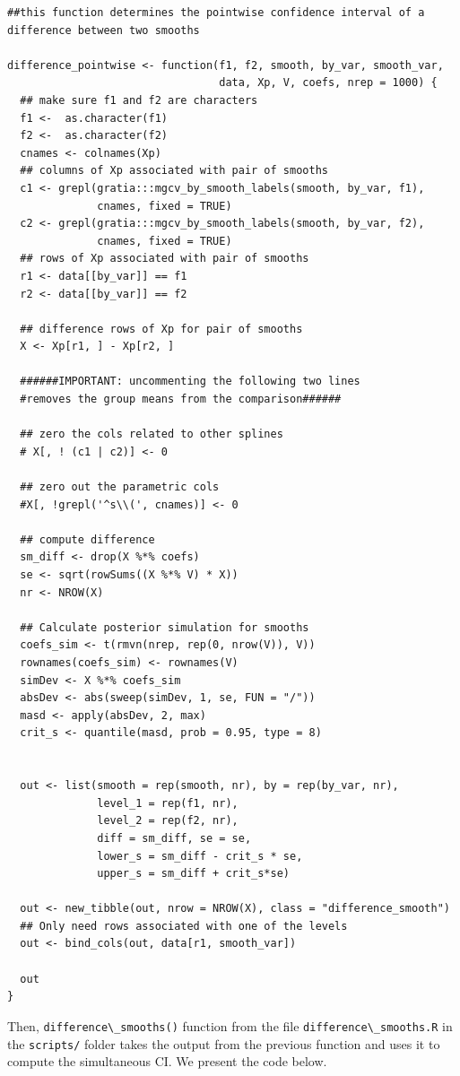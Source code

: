 \documentclass[
]{article}
\newcommand{\passthrough}[1]{#1}
\begin{document}
\begin{lstlisting}
##this function determines the pointwise confidence interval of a difference between two smooths

difference_pointwise <- function(f1, f2, smooth, by_var, smooth_var, 
                                 data, Xp, V, coefs, nrep = 1000) {
  ## make sure f1 and f2 are characters
  f1 <-  as.character(f1)
  f2 <-  as.character(f2)
  cnames <- colnames(Xp)
  ## columns of Xp associated with pair of smooths
  c1 <- grepl(gratia:::mgcv_by_smooth_labels(smooth, by_var, f1),
              cnames, fixed = TRUE)
  c2 <- grepl(gratia:::mgcv_by_smooth_labels(smooth, by_var, f2), 
              cnames, fixed = TRUE)
  ## rows of Xp associated with pair of smooths
  r1 <- data[[by_var]] == f1
  r2 <- data[[by_var]] == f2
  
  ## difference rows of Xp for pair of smooths
  X <- Xp[r1, ] - Xp[r2, ]
  
  ######IMPORTANT: uncommenting the following two lines
  #removes the group means from the comparison######
  
  ## zero the cols related to other splines
  # X[, ! (c1 | c2)] <- 0
  
  ## zero out the parametric cols
  #X[, !grepl('^s\\(', cnames)] <- 0
  
  ## compute difference
  sm_diff <- drop(X %*% coefs)
  se <- sqrt(rowSums((X %*% V) * X))
  nr <- NROW(X)
  
  ## Calculate posterior simulation for smooths
  coefs_sim <- t(rmvn(nrep, rep(0, nrow(V)), V))
  rownames(coefs_sim) <- rownames(V)
  simDev <- X %*% coefs_sim
  absDev <- abs(sweep(simDev, 1, se, FUN = "/"))
  masd <- apply(absDev, 2, max)
  crit_s <- quantile(masd, prob = 0.95, type = 8)
  
  
  out <- list(smooth = rep(smooth, nr), by = rep(by_var, nr),
              level_1 = rep(f1, nr),
              level_2 = rep(f2, nr),
              diff = sm_diff, se = se,
              lower_s = sm_diff - crit_s * se,
              upper_s = sm_diff + crit_s*se)
  
  out <- new_tibble(out, nrow = NROW(X), class = "difference_smooth")
  ## Only need rows associated with one of the levels
  out <- bind_cols(out, data[r1, smooth_var])
  
  out
}
\end{lstlisting}

Then, \passthrough{\lstinline!difference\_smooths()!} function from the file \passthrough{\lstinline!difference\_smooths.R!} in the \passthrough{\lstinline!scripts/!} folder takes the output from the previous function and uses it to compute the simultaneous CI.
We present the code below.
\end{document}
